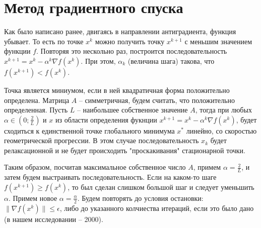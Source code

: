 \documentclass[12pt]{article}
\begin{document}
\newpage
\section{Метод градиентного спуска}

Как было написано ранее, двигаясь в направлении антиградиента, функция убывает. То есть по точке $x^k$ можно получить точку $x^{k+1}$ с меньшим значением функции $f$. Повторяя это нескольно раз, построится последовательность $x^{k+1} = x^{k} - \alpha^{k} \nabla f(x^k)$. При этом, $\alpha_k$ (величина шага) такова, что $f(x^{k+1}) < f(x^k)$.  

Точка является миниумом, если в ней квадратичная форма положительно определена. Матрица $A$ -- симметричная, будем считать, что положительно определенная. Пусть $L$ -- наибольшее собственное значение $A$, тогда при любых $\alpha \in \left(0; \frac{2}{L} \right)$ и $x$ из области определения фукнции $x^{k+1} = x^{k} - \alpha^{k} \nabla f(x^k)$, будет сходиться к единственной точке глобального минимума $x^*$ линейно, со скоростью геометрической прогрессии. В этом случае последовательность $x_k$ будет релаксационной и не будет происходить "проскакивания" стационарной точки.

Таким образом, посчитав максимальное собственное число $A$, примем $\alpha = \frac{2}{L}$, и затем будем выстраивать последовательность. Если на каком-то шаге $f(x^{k+1}) \geqslant f(x^k)$, то был сделан слишком большой шаг и следует уменьшить $\alpha$. Примем новое $\alpha = \frac{\alpha}{2}$. Будем повторять до условия остановки: $\lVert \nabla f(x^k) \rVert \leqslant \epsilon$, либо до указанного колчиества итераций, если это было дано (в нашем исследовании -- 2000).
\end{document}
